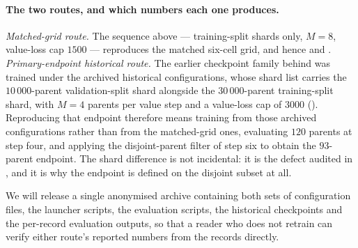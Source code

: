 \paragraph{The two routes, and which numbers each one produces.} \emph{Matched-grid route.}
The sequence above --- training-split shards only, $M = 8$, value-loss cap $1500$ --- reproduces
the matched six-cell grid, and hence  and .
\emph{Primary-endpoint historical route.} The earlier checkpoint family behind
 was trained under the archived historical configurations, whose shard list
carries the $10\,000$-parent validation-split shard alongside the $30\,000$-parent
training-split shard, with $M = 4$ parents per value step and a value-loss cap of $3000$
(). Reproducing that endpoint therefore means training from those
archived configurations rather than from the matched-grid ones, evaluating $120$ parents at
step four, and applying the disjoint-parent filter of step six to obtain the $93$-parent
endpoint. The shard difference is not incidental: it is the defect audited in
, and it is why the endpoint is defined on the disjoint subset at all.

We will release a single anonymised archive containing both sets of configuration files, the
launcher scripts, the evaluation scripts, the historical checkpoints and the per-record
evaluation outputs, so that a reader who does not retrain can verify either route's reported
numbers from the records directly.
